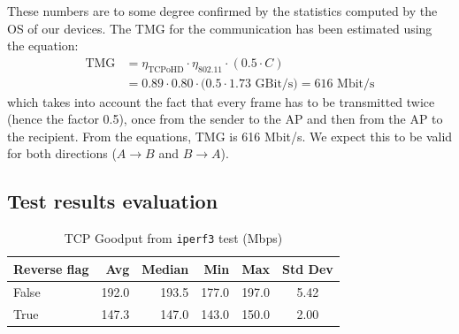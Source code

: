 These numbers are to some degree confirmed by the statistics computed by the OS of our devices.
The TMG for the communication has been estimated using the equation:
\begin{align*}
    \text{TMG}&=\eta_{\text{TCPoHD}}\cdot\eta_{\text{802.11}}\cdot (0.5\cdot C)\\&=0.89\cdot 0.80\cdot (0.5\cdot1.73\text{ GBit/s)}=616\text{ Mbit/s}
\end{align*}
which takes into account the fact that every frame has to be transmitted twice (hence the factor 0.5), once from the sender to the AP and then from the AP to the recipient.
From the equations, TMG is 616 Mbit/s. We expect this to be valid for both directions ($A\to B$ and $B\to A$).

\subsection{Test results evaluation}
\begin{table}[htbp]
    \centering
    \caption{TCP Goodput from \texttt{iperf3} test (Mbps)}
    \label{tab:TCPoHD-throughput}
    \begin{tabular}{lrrrrc}
        \hline
        \textbf{Reverse flag} & \textbf{Avg} & \textbf{Median} & \textbf{Min} & \textbf{Max} & \textbf{Std Dev} \\
        \hline
        False & 192.0 & 193.5 & 177.0 & 197.0 & 5.42 \\
        True & 147.3 & 147.0 & 143.0 & 150.0 & 2.00 \\
        \hline
    \end{tabular}
\end{table}

